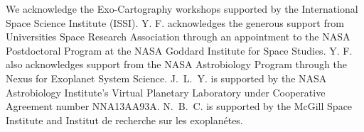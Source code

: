 \documentclass[iop,numberedappendix,apj]{emulateapj}
\def\memoYF#1{\color{red}[YF: {\bf #1}]\color{black}}
\begin{document}


\acknowledgements

We acknowledge the Exo-Cartography workshops supported by the International Space Science Institute (ISSI). 
Y. F. acknowledges the generous support from Universities Space Research Association through an appointment to the NASA Postdoctoral Program at the NASA Goddard Institute for Space Studies. 
Y. F. also acknowledges support from the NASA Astrobiology Program through the Nexus for Exoplanet System Science. 
J.~L.~Y. is supported by the NASA Astrobiology Institute's Virtual Planetary Laboratory under Cooperative Agreement number NNA13AA93A. 
N.~B.~C. is supported by the McGill Space Institute and Institut de recherche sur les exoplan\'etes.  


\end{document}
